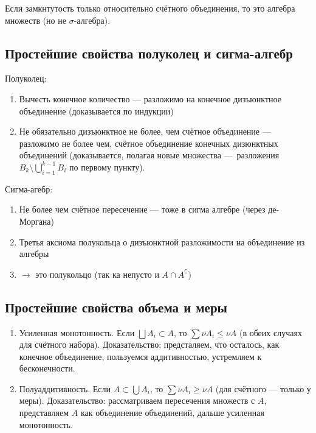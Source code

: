\documentclass[12pt, a4paper, oneside]{memoir}
\begin{document}
\begin{remark}
    Если замкнтутость только относительно счётного объединения, то это алгебра множеств (но не $\sigma$-алгебра).
\end{remark}


\subsection{Простейшие свойства полуколец и сигма-алгебр}

Полуколец:
\begin{enumerate}
    \item Вычесть конечное количество — разложимо на конечное дизъюнктное объединение (доказывается по индукции)
    \item Не обязательно дизъюнктное не более, чем счётное объединение — 
    разложимо не более чем, счётное объединение конечных дизюнктных объединений 
    (доказывается, полагая новые множества — разложения $B_k \setminus \bigcup_{i = 1}^{k - 1} B_i$ по первому пункту).
\end{enumerate}

Сигма-агебр:
\begin{enumerate}
    \item Не более чем счётное пересечение — тоже в сигма алгебре (через де-Моргана)
    \item Третья аксиома полукольца о дизъюнктной разложимости на объединение из алгебры
    \item $→$ это полукольцо (так ка непусто и $A \cap A^{\complement}$)
\end{enumerate}

\subsection{Простейшие свойства объема и меры}

\begin{enumerate}
    \item Усиленная монотонность. Если $\bigsqcup A_i \subset A$, то $\sum \nu A_i \leqslant \nu A$ (в обеих случаях для счётного набора). Доказательство: предсталяем, что осталось, как конечное объединение, пользуемся аддитивностью, устремляем к бесконечности.
    \item Полуаддитивность. Если $A \subset \bigcup A_i$, то $\sum \nu A_i \geqslant \nu A$ (для счётного — только у меры). Доказательство: рассматриваем пересечения множеств с $A$, представляем $A$ как объединение объединений, дальше усиленная монотонность.
\end{enumerate}
\end{document}
